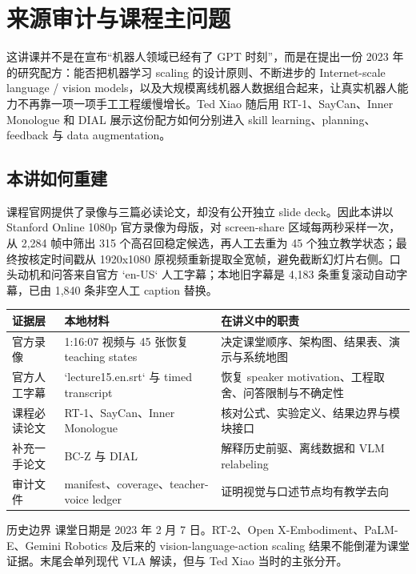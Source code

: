 \documentclass[a4paper]{article}
\begin{document}
\makecscover

\section{来源审计与课程主问题}

这讲课并不是在宣布“机器人领域已经有了 GPT 时刻”，而是在提出一份 2023 年的研究配方：能否把机器学习 scaling 的设计原则、不断进步的 Internet-scale language / vision models，以及大规模离线机器人数据组合起来，让真实机器人能力不再靠一项一项手工工程缓慢增长。Ted Xiao 随后用 RT-1、SayCan、Inner Monologue 和 DIAL 展示这份配方如何分别进入 skill learning、planning、feedback 与 data augmentation。

\subsection{本讲如何重建}

课程官网提供了录像与三篇必读论文，却没有公开独立 slide deck。因此本讲以 Stanford Online 1080p 官方录像为母版，对 screen-share 区域每两秒采样一次，从 2,284 帧中筛出 315 个高召回稳定候选，再人工去重为 45 个独立教学状态；最终按核定时间戳从 1920x1080 原视频重新提取全宽帧，避免截断幻灯片右侧。口头动机和问答来自官方 `en-US` 人工字幕；本地旧字幕是 4,183 条重复滚动自动字幕，已由 1,840 条非空人工 caption 替换。

\begin{longtable}{L{0.21\textwidth}L{0.31\textwidth}L{0.38\textwidth}}
\toprule
证据层 & 本地材料 & 在讲义中的职责 \\
\midrule
官方录像 & 1:16:07 视频与 45 张恢复 teaching states & 决定课堂顺序、架构图、结果表、演示与系统地图 \\
官方人工字幕 & `lecture15.en.srt` 与 timed transcript & 恢复 speaker motivation、工程取舍、问答限制与不确定性 \\
课程必读论文 & RT-1、SayCan、Inner Monologue & 核对公式、实验定义、结果边界与模块接口 \\
补充一手论文 & BC-Z 与 DIAL & 解释历史前驱、离线数据和 VLM relabeling \\
审计文件 & manifest、coverage、teacher-voice ledger & 证明视觉与口述节点均有教学去向 \\
\bottomrule
\end{longtable}

\begin{warningbox}{历史边界}
课堂日期是 2023 年 2 月 7 日。RT-2、Open X-Embodiment、PaLM-E、Gemini Robotics 及后来的 vision-language-action scaling 结果不能倒灌为课堂证据。末尾会单列现代 VLA 解读，但与 Ted Xiao 当时的主张分开。
\end{warningbox}
\end{document}

